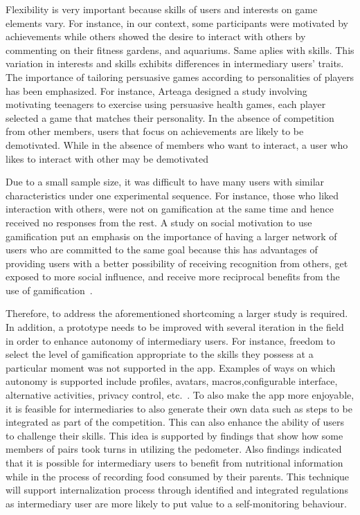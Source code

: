 \documentclass{sig-alternate}
\begin{document}
Flexibility is very important because skills of users and interests on game elements vary. For instance,  in our context, some participants were motivated by achievements while others showed the desire to interact with others by commenting on their fitness gardens, and aquariums. Same aplies with skills. This variation in interests and skills exhibits differences in intermediary users' traits. The importance of tailoring persuasive games according to personalities of players has been emphasized\cite{orji2013:tailoring}. For instance, Arteaga \cite{arteaga2010:persuasive} designed a study involving motivating teenagers to exercise using persuasive health games, each player selected a game that matches their personality. In the absence of competition from other members, users that focus  on achievements are likely to be demotivated. While in the absence of members who want to interact, a user who likes to interact with other may be demotivated

Due to a small sample size, it was difficult to have many users with similar characteristics under one experimental sequence. For instance, those who liked interaction with others, were not on gamification at the same time and hence received no responses from the rest. A study on social motivation to use gamification put an emphasis on the importance of having a larger network of users who are committed to the same goal because this has advantages of providing users with a better possibility of receiving recognition from others, get exposed to more social influence, and receive more reciprocal benefits from the use of gamification~\cite{hamari2013social}.

Therefore, to address the aforementioned shortcoming a larger study is required. In addition, a prototype needs to be improved with several iteration in the field in order to enhance autonomy of intermediary users. For instance, freedom to select the level of gamification appropriate to the skills they possess at a particular moment was not supported in the app. Examples of ways on which autonomy is supported include profiles, avatars, macros,configurable interface, alternative activities, privacy control, etc.~\cite{francisco2012analysis}. To also make the app more enjoyable, it is feasible for intermediaries to also generate their own data such as steps to be integrated as part of the competition. This can also enhance the ability of users to challenge their skills. This idea is supported by findings that show how some members of pairs took turns in utilizing the pedometer. Also findings indicated that it is possible for intermediary users to benefit from nutritional information while in the process of recording food consumed by their parents. This technique will support internalization process through identified and integrated regulations as intermediary user are more likely to put value to a self-monitoring behaviour.
\end{document}
